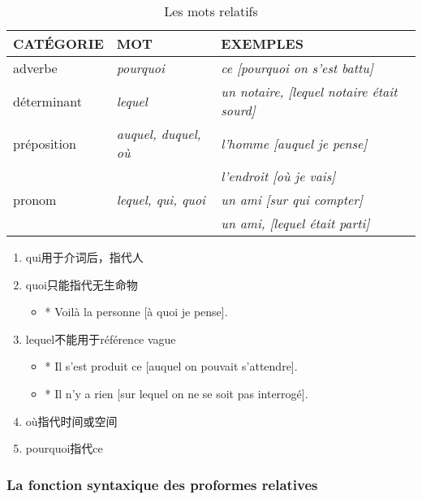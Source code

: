 \documentclass[UTF8]{report}
\begin{document}
\begin{table}[H]
    \centering
    \begin{tabular}{|l|l|l|}
    \hline
    \rowcolor{cyan!20}
    \textbf{CATÉGORIE} & \textbf{MOT} & \textbf{EXEMPLES} \\
    \hline
    adverbe & {\textit{pourquoi}} & {\textit{ce [pourquoi on s'est battu]}} \\
    \hline
    déterminant & {\textit{lequel}} & {\textit{un notaire, [lequel notaire était sourd]}} \\
    \hline
    préposition & {\textit{auquel, duquel, où}} & {\textit{l'homme [auquel je pense]}} \\
    & & {\textit{l'endroit [où je vais]}} \\
    \hline
    pronom & {\textit{lequel, qui, quoi}} & {\textit{un ami [sur qui compter]}} \\
    & & {\textit{un ami, [lequel était parti]}} \\
    \hline
    \end{tabular}
    \caption{Les mots relatifs}
\end{table}

\begin{enumerate}
    \item qui用于介词后，指代人
    \item quoi只能指代无生命物
    \begin{itemize}
        \item * Voilà la personne [à quoi je pense].
    \end{itemize}
    \item lequel不能用于référence vague
    \begin{itemize}
        \item * Il s’est produit ce [auquel on pouvait s’attendre].
        \item * Il n’y a rien [sur lequel on ne se soit pas interrogé].
    \end{itemize}
    \item où指代时间或空间
    \item pourquoi指代ce
\end{enumerate}

\subsubsection{La fonction syntaxique des proformes relatives}
\end{document}
